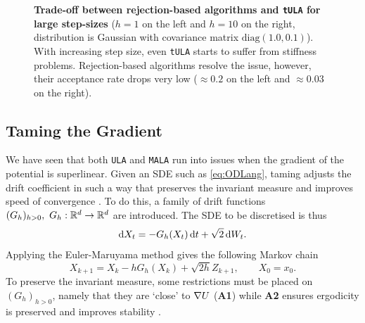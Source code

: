 \begin{figure}[H]
\begin{minipage}[b]{0.49\textwidth}
  \end{minipage}
   \caption{\textbf{Trade-off between rejection-based algorithms and \texttt{tULA} for large step-sizes} ($h = 1$ on the left and $h = 10$ on the right, distribution is Gaussian with covariance matrix $\text{diag}(1.0, 0.1)$). With increasing step size, even \texttt{tULA} starts to suffer from stiffness problems. Rejection-based algorithms resolve the issue, however, their acceptance rate drops very low ($\approx 0.2$ on the left and $\approx 0.03$ on the right). }
\end{figure}

\subsection{Taming the Gradient}
We have seen that both \texttt{ULA} and \texttt{MALA} run into issues when the gradient of the potential is superlinear. Given an SDE such as \eqref{eq:ODLang}, taming adjusts the drift coefficient in such a way that preserves the invariant measure and improves speed of convergence \cite{Brosse18tULA,RT96,Sabanis13}. To do this, a family of drift functions \((G_h)_{h>0}, \ G_h:\mathbb{R}^d \to \mathbb{R}^d\) are introduced. The SDE to be discretised is thus
	\begin{equation*} \mathop{}\!\mathrm{d} X_t = -G_h(X_t)\mathop{}\!\mathrm{d} t +\sqrt{2}\mathop{}\!\mathrm{d} W_t. \end{equation*}
Applying the Euler-Maruyama method gives the following Markov chain
	\[X_{k+1} =X_k-hG_h(X_k)+\sqrt{2h}Z_{k+1},\qquad  X_0=x_0.\]
To preserve the invariant measure, some restrictions must be placed on \((G_h)_{h>0}\), namely that they are `close' to \(\nabla U\) ({\bf A1}) while {\bf A2} ensures ergodicity is preserved and improves stability \cite{Brosse18tULA}. 

